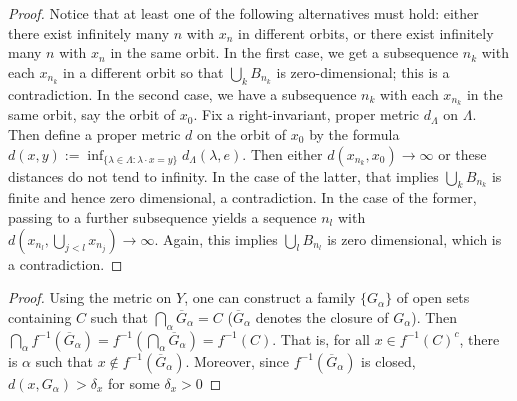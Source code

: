 \documentclass[12pt]{article}
\begin{document}
{\begin{proof}
Notice that at least one of the following alternatives must hold: either there exist infinitely many $n$ with $x_n$ in different orbits, or there exist infinitely many $n$ with $x_n$ in the same orbit.  In the first case, we get a subsequence $n_k$ with each $x_{n_k}$ in a different orbit so that $\bigcup_{k} B_{n_k}$ is zero-dimensional; this is a contradiction.  In the second case, we have a subsequence $n_k$ with each $x_{n_k}$ in the same orbit, say the orbit of $x_0$.  Fix a right-invariant, proper metric $d_\Lambda$ on $\Lambda$.  Then define a proper metric $d$ on the orbit of $x_0$ by the formula $d(x, y):=\inf_{\{\lambda\in \Lambda : \lambda\cdot x = y\}} d_\Lambda(\lambda, e)$.  Then either $d(x_{n_k}, x_0)\to \infty$ or these distances do not tend to infinity.  In the case of the latter, that implies $\bigcup_{k} B_{n_k}$ is finite and hence zero dimensional, a contradiction.  In the case of the former, passing to a further subsequence yields a sequence $n_l$ with $d(x_{n_l}, \bigcup_{j<l} x_{n_j})\to \infty$.  Again, this implies $\bigcup_{l} B_{n_l}$ is zero dimensional, which is a contradiction.  \end{proof}


 \label{neighborhoods lemma}

\begin{proof}
Using the metric on $Y$, one can construct a family $\{G_\alpha\}$ of open sets containing $C$ such that $\bigcap_\alpha \overline{G}_\alpha = C$ ($\overline{G}_\alpha$ denotes the closure of $G_\alpha$).  Then $\bigcap_\alpha f^{-1}(\overline{G}_\alpha) = f^{-1}(\bigcap_\alpha \overline{G}_\alpha) = f^{-1}(C)$.  That is, for all $x\in f^{-1}(C)^c$, there is $\alpha$ such that $x\notin f^{-1}(\overline{G}_\alpha)$.  Moreover, since $f^{-1}(\overline{G}_\alpha)$ is closed, $d(x, G_{\alpha})>\delta_x$ for some $\delta_x>0$ 


\end{proof}}
\end{document}
